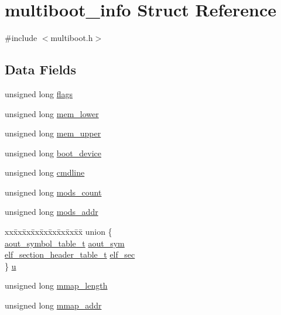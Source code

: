 \hypertarget{structmultiboot__info}{}\section{multiboot\+\_\+info Struct Reference}
\label{structmultiboot__info}


{\ttfamily \#include $<$multiboot.\+h$>$}

\subsection*{Data Fields}
\begin{DoxyCompactItemize}
\item 
unsigned long \hyperlink{structmultiboot__info_aca1b83b50f1b685cd0db68076de24b1d}{flags}
\item 
unsigned long \hyperlink{structmultiboot__info_a3361bad707fe6a2949ffb39b472d1eba}{mem\+\_\+lower}
\item 
unsigned long \hyperlink{structmultiboot__info_ad8e18348759fec119f6398732119cd50}{mem\+\_\+upper}
\item 
unsigned long \hyperlink{structmultiboot__info_aab9d0d6e0dccb44943adf8040aa83622}{boot\+\_\+device}
\item 
unsigned long \hyperlink{structmultiboot__info_a3445b94d902a3146b2eaf8fa04e215c4}{cmdline}
\item 
unsigned long \hyperlink{structmultiboot__info_a13052f0e072cf2b88f92a2f8c93332a0}{mods\+\_\+count}
\item 
unsigned long \hyperlink{structmultiboot__info_a6cf0a1bab49c3f04870ce3ded4651fca}{mods\+\_\+addr}
\item 
\begin{tabbing}
xx\=xx\=xx\=xx\=xx\=xx\=xx\=xx\=xx\=\kill
union \{\\
\>\hyperlink{multiboot_8h_a0f63f69abdd0ba14d60b38b0f9bb8161}{aout\_symbol\_table\_t} \hyperlink{structmultiboot__info_a050e3dcaab3b190d25f7ab08060f6178}{aout\_sym}\\
\>\hyperlink{multiboot_8h_aa22102583b09d2fdc22f21f9201a74ee}{elf\_section\_header\_table\_t} \hyperlink{structmultiboot__info_a188a9ed1c804bf6df8daec9f0f7aab95}{elf\_sec}\\
\} \hyperlink{structmultiboot__info_a61dc20144c958a07801f479c74e5867e}{u}\\

\end{tabbing}\item 
unsigned long \hyperlink{structmultiboot__info_a80f4d7d5520b59b4d2b927d6520707ab}{mmap\+\_\+length}
\item 
unsigned long \hyperlink{structmultiboot__info_a5b369df50eabe11a25bb192c293c9ab4}{mmap\+\_\+addr}
\end{DoxyCompactItemize}


